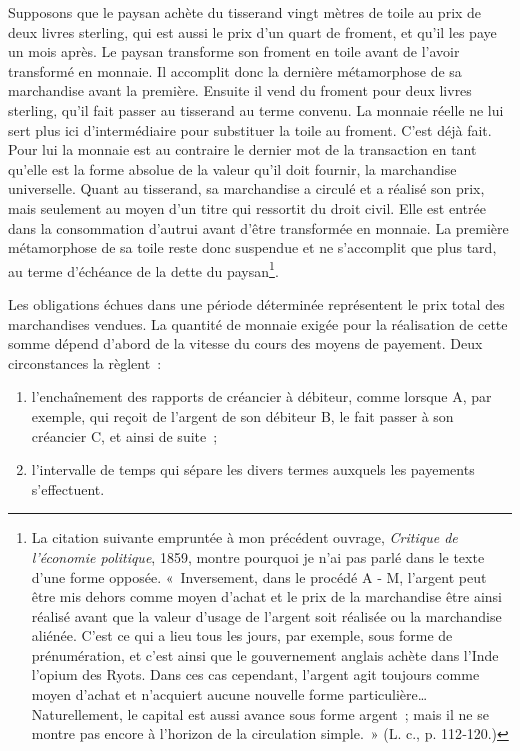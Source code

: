 \documentclass[french,twoside]{book} %
\begin{document}
Supposons que le paysan achète du tisserand vingt mètres de toile au prix de deux livres sterling, qui est aussi le prix d’un quart de froment, et qu’il les paye un mois après. Le paysan transforme son froment en toile avant de l’avoir transformé en monnaie. Il accomplit donc la dernière métamorphose de sa marchandise avant la première. Ensuite il vend du froment pour deux livres sterling, qu’il fait passer au tisserand au terme convenu. La monnaie réelle ne lui sert plus ici d’intermédiaire pour substituer la toile au froment. C’est déjà fait. Pour lui la monnaie est au contraire le dernier mot de la transaction en tant qu’elle est la forme absolue de la valeur qu’il doit fournir, la marchandise universelle. Quant au tisserand, sa marchandise a circulé et a réalisé son prix, mais seulement au moyen d’un titre qui ressortit du droit civil. Elle est entrée dans la consommation d’autrui avant d’être transformée en monnaie. La première métamorphose de sa toile reste donc suspendue et ne s’accomplit que plus tard, au terme d’échéance de la dette du paysan\footnote{La citation suivante empruntée à mon précédent ouvrage, \emph{Critique de l’économie politique}, 1859, montre pourquoi je n’ai pas parlé dans le texte d’une forme opposée. « Inversement, dans le procédé A ‑ M, l’argent peut être mis dehors comme moyen d’achat et le prix de la marchandise être ainsi réalisé avant que la valeur d’usage de l’argent soit réalisée ou la marchandise aliénée. C’est ce qui a lieu tous les jours, par exemple, sous forme de prénumération, et c’est ainsi que le gouvernement anglais achète dans l’Inde l’opium des Ryots. Dans ces cas cependant, l’argent agit toujours comme moyen d’achat et n’acquiert aucune nouvelle forme particulière… Naturellement, le capital est aussi avance sous forme argent ; mais il ne se montre pas encore à l’horizon de la circulation simple. » (L. c., p. 112‑120.)}.\par
Les obligations échues dans une période déterminée représentent le prix total des marchandises vendues. La quantité de monnaie exigée pour la réalisation de cette somme dépend d’abord de la vitesse du cours des moyens de payement. Deux circonstances la règlent :\par

\begin{enumerate}[itemsep=0pt,]
\item l’enchaînement des rapports de créancier à débiteur, comme lorsque A, par exemple, qui reçoit de l’argent de son débiteur B, le fait passer à son créancier C, et ainsi de suite ;
\item l’intervalle de temps qui sépare les divers termes auxquels les payements s’effectuent.
\end{enumerate}
\end{document}
